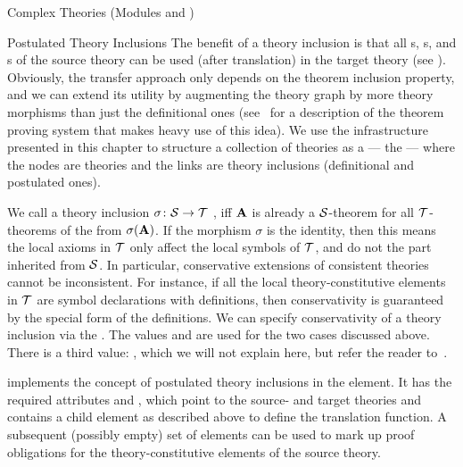 \begin{tchapter}[id=complex-theories,short=Complex Theories]{Complex Theories (Modules
    {} and {})}
\begin{tsection}[id=theory-inclusions]{Postulated Theory Inclusions}
  The benefit of a theory inclusion is that all {s},
  {s}, and {s} of the source theory can be used
  (after translation) in the target theory (see {}).
  Obviously, the transfer approach only depends on the theorem inclusion property, and we
  can extend its utility by augmenting the theory graph by more theory morphisms than just
  the definitional ones (see~\cite{FaGu93} for a description of the {\imps} theorem
  proving system that makes heavy use of this idea).  We use the infrastructure presented
  in this chapter to structure a collection of theories as a {} --- the
  {} --- where the nodes are theories and the links are theory
  inclusions (definitional and postulated ones).

  We call a theory inclusion $\sigma\colon{\cal S}\to{\cal T}$ {}, iff ${\bf A}$ is
  already a ${\cal S}$-theorem for all ${\cal T}$-theorems of the from $\sigma({\bf A})$. If the
  morphism $\sigma$ is the identity, then this means the local axioms in ${\cal T}$ only affect
  the local symbols of ${\cal T}$, and do not the part inherited from ${\cal S}$. In particular,
  conservative extensions of consistent theories cannot be inconsistent. For instance, if
  all the local theory-constitutive elements in ${\cal T}$ are symbol declarations with
  definitions, then conservativity is guaranteed by the special form of the
  definitions. We can specify conservativity of a theory inclusion via the
  {}. The values 
  and 
  are used for the two cases discussed above. There is a third value:
  ,
  which we will not explain here, but refer the reader to~\cite{MAH-06-a}.

  {\omdoc} implements the concept of postulated theory inclusions in the
  {} {} element. It has the required
  attributes {} and {},
  which point to the source- and target theories and contains a {} child
  element as described above to define the translation function. A subsequent (possibly
  empty) set of {} elements can be used to mark up proof obligations
  for the theory-constitutive elements of the source theory.


\end{tsection}
\end{tchapter}
